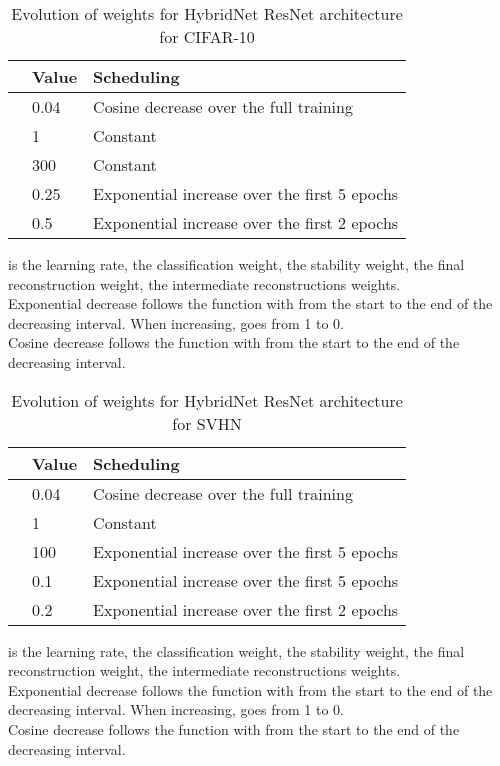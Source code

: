 \documentclass[runningheads]{llncs}
\begin{document}
\begin{table}[htbp]
\centering
\caption{Evolution of weights for HybridNet ResNet architecture for CIFAR-10}
\label{tab:resnetsched}
\begin{threeparttable}
\setlength{\tabcolsep}{4pt}
\begin{tabular}{ l l l}
\toprule
 & Value & Scheduling \\
\midrule
 & 0.04 & Cosine decrease over the full training \\
 & 1 & Constant \\
 & 300 & Constant \\
 & 0.25 & Exponential increase over the first 5 epochs \\
 & 0.5 & Exponential increase over the first 2 epochs \\
\bottomrule
\end{tabular}
\begin{tablenotes}
 is the learning rate,  the classification weight,  the stability weight,  the final reconstruction weight,  the intermediate reconstructions weights.\\
Exponential decrease follows the function  with  from the start to the end of the decreasing interval. When increasing,  goes from 1 to 0.\\
Cosine decrease follows the function  with  from the start to the end of the decreasing interval.
\end{tablenotes}
\end{threeparttable}
\end{table}



\begin{table}[htbp]
\centering
\caption{Evolution of weights for HybridNet ResNet architecture for SVHN}
\label{tab:resnetschedsvhn}
\begin{threeparttable}
\setlength{\tabcolsep}{4pt}
\begin{tabular}{ l l l}
\toprule
 & Value & Scheduling \\
\midrule
 & 0.04 & Cosine decrease over the full training \\
 & 1 & Constant \\
 & 100 & Exponential increase over the first 5 epochs \\
 & 0.1 & Exponential increase over the first 5 epochs \\
 & 0.2 & Exponential increase over the first 2 epochs \\
\bottomrule
\end{tabular}
\begin{tablenotes}
 is the learning rate,  the classification weight,  the stability weight,  the final reconstruction weight,  the intermediate reconstructions weights.\\
Exponential decrease follows the function  with  from the start to the end of the decreasing interval. When increasing,  goes from 1 to 0.\\
Cosine decrease follows the function  with  from the start to the end of the decreasing interval.
\end{tablenotes}
\end{threeparttable}
\end{table}
\end{document}
